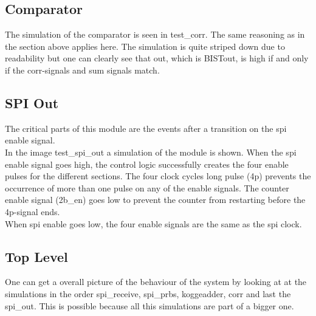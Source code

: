 \subsection{Comparator}
The simulation of the comparator is seen in test\_corr. The same reasoning as in the section above applies here. The simulation is quite striped down due to readability but one can clearly see that out, which is BISTout, is high if and only if the corr-signals and sum signals match.

\subsection{SPI Out}
The critical parts of this module are the events after a transition on the spi enable signal.\\


In the image test\_spi\_out a simulation of the module is shown. When the spi enable signal goes high, the control logic successfully creates the four enable pulses for the different sections. The four clock cycles long pulse (4p) prevents the occurrence of more than one pulse on any of the enable signals. The counter enable signal (2b\_en) goes low to prevent the counter from restarting before the 4p-signal ends. \\
When spi enable goes low, the four enable signals are the same as the spi clock.\\


\subsection{Top Level}
One can get a overall picture of the behaviour of the system by looking at at the simulations in the order spi\_receive, spi\_prbs, koggeadder, corr and last the spi\_out. This is possible because all this simulations are part of a bigger one.
